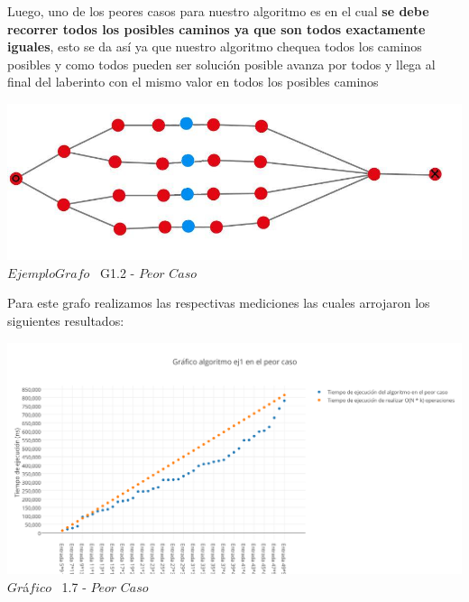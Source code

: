 Luego, uno de los peores casos para nuestro algoritmo es en el cual  \textbf{se debe recorrer todos los posibles caminos ya que son todos exactamente iguales}, esto se da as\'i ya que nuestro algoritmo chequea todos los caminos posibles y como todos pueden ser soluci\'on posible avanza por todos y llega al final del laberinto con el mismo valor en todos los posibles caminos\\

\vspace*{0.3cm} \vspace*{0.3cm}
  \begin{center}
\includegraphics[scale=0.65]{./EJ1/ej1grafopeorcaso.jpeg}
{$Ejemplo Grafo$ \ G1.2 - $Peor$ $Caso$}
  \end{center}
  \vspace*{0.3cm}

Para este grafo realizamos las respectivas mediciones las cuales arrojaron los siguientes resultados:\\


\vspace*{0.3cm} \vspace*{0.3cm}
  \begin{center}
\includegraphics[scale=0.65]{./EJ1/peorcaso.png}
{$Gr$\'a$fico$ \ 1.7 - $Peor$ $Caso$}
  \end{center}
  \vspace*{0.3cm}

